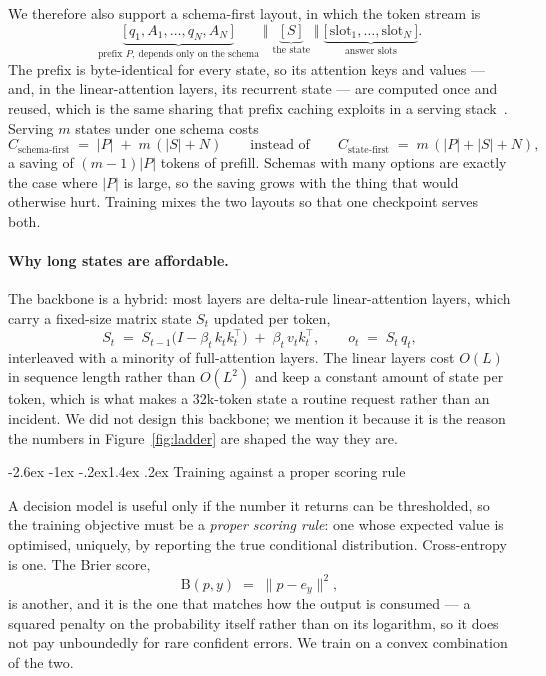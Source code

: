 \documentclass[11pt]{article}
\makeatletter
\renewcommand\subsection{\@startsection{subsection}{2}{\z@}%
  {-2.6ex \@plus -1ex \@minus -.2ex}{1.4ex \@plus.2ex}%
  {\normalfont\normalsize\bfseries\color{accent!85!black}}}
\newcommand{\1}{\mathbf{1}}
\makeatother
\begin{document}
We therefore also support a schema-first layout, in which the token stream is
\begin{equation}
\underbrace{\big[\,q_1, A_1, \dots, q_N, A_N\,\big]}_{\text{prefix } P,\ \text{depends only on the schema}}
\;\Vert\;
\underbrace{\big[\,S\,\big]}_{\text{the state}}
\;\Vert\;
\underbrace{\big[\,\text{slot}_1, \dots, \text{slot}_N\,\big]}_{\text{answer slots}} .
\end{equation}
The prefix is byte-identical for every state, so its attention keys and values --- and, in the
linear-attention layers, its recurrent state --- are computed once and reused, which is the same
sharing that prefix caching exploits in a serving stack~\cite{kwon2023efficient}. Serving $m$ states
under one schema costs
\begin{equation}
C_{\text{schema-first}} \;=\; |P| \;+\; m\,(|S| + N)
\qquad\text{instead of}\qquad
C_{\text{state-first}} \;=\; m\,(|P| + |S| + N),
\end{equation}
a saving of $(m-1)|P|$ tokens of prefill. Schemas with many options are exactly the case where $|P|$
is large, so the saving grows with the thing that would otherwise hurt. Training mixes the two
layouts so that one checkpoint serves both.

\paragraph{Why long states are affordable.} The backbone is a hybrid: most layers are
delta-rule linear-attention layers, which carry a fixed-size matrix state $S_t$ updated per token,
\begin{equation}
S_t \;=\; S_{t-1}\big(I - \beta_t\, k_t k_t^{\!\top}\big) \;+\; \beta_t\, v_t k_t^{\!\top},
\qquad
o_t \;=\; S_t\, q_t ,
\end{equation}
interleaved with a minority of full-attention layers. The linear layers cost $O(L)$ in sequence
length rather than $O(L^2)$ and keep a constant amount of state per token, which is what makes a
32k-token state a routine request rather than an incident. We did not design this backbone; we
mention it because it is the reason the numbers in Figure~\ref{fig:ladder} are shaped the way they
are.

\subsection{Training against a proper scoring rule}
\label{sec:objective}

A decision model is useful only if the number it returns can be thresholded, so the training
objective must be a \emph{proper scoring rule}: one whose expected value is optimised, uniquely, by
reporting the true conditional distribution. Cross-entropy is one. The Brier score,
\begin{equation}
\mathrm{B}(p, y) \;=\; \lVert p - e_y \rVert^2 ,
\end{equation}
is another, and it is the one that matches how the output is consumed --- a squared penalty on the
probability itself rather than on its logarithm, so it does not pay unboundedly for rare confident
errors. We train on a convex combination of the two.
\end{document}
